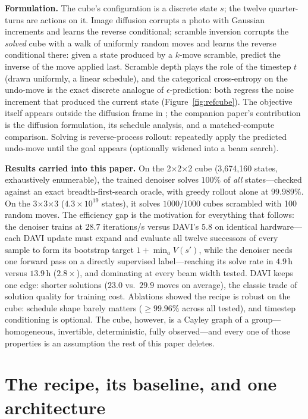 \documentclass[11pt]{article}
\begin{document}
\textbf{Formulation.} The cube's configuration is a discrete state $s$; the
twelve quarter-turns are actions on it. Image diffusion corrupts a photo
with Gaussian increments and learns the reverse conditional; scramble
inversion corrupts the \emph{solved} cube with a walk of uniformly random
moves and learns the reverse conditional there: given a state produced by a
$k$-move scramble, predict the inverse of the move applied last. Scramble
depth plays the role of the timestep $t$ (drawn uniformly, a linear
schedule), and the categorical cross-entropy on the undo-move is the exact
discrete analogue of $\epsilon$-prediction: both regress the noise increment
that produced the current state (Figure~\ref{fig:refcube}). The objective
itself appears outside the diffusion frame in \citet{takano2023}; the
companion paper's contribution is the diffusion formulation, its schedule
analysis, and a matched-compute comparison. Solving is reverse-process
rollout: repeatedly apply the predicted undo-move until the goal appears
(optionally widened into a beam search).

\textbf{Results carried into this paper.} On the 2$\times$2$\times$2 cube
(3{,}674{,}160 states, exhaustively enumerable), the trained denoiser solves
$100\%$ of \emph{all} states---checked against an exact breadth-first-search
oracle, with greedy rollout alone at $99.989\%$. On the 3$\times$3$\times$3
($4.3\times10^{19}$ states), it solves $1000/1000$ cubes scrambled with 100
random moves. The efficiency gap is the motivation for everything that
follows: the denoiser trains at $28.7$ iterations/s versus DAVI's $5.8$ on
identical hardware---each DAVI update must expand and evaluate all twelve
successors of every sample to form its bootstrap target
$1+\min_a V(s')$, while the denoiser needs one forward pass on a directly
supervised label---reaching its solve rate in $4.9$\,h versus $13.9$\,h
($2.8\times$), and dominating at every beam width tested. DAVI keeps one
edge: shorter solutions ($23.0$ vs.\ $29.9$ moves on average), the classic
trade of solution quality for training cost. Ablations showed the recipe is
robust on the cube: schedule shape barely matters ($\geq 99.96\%$ across all
tested), and timestep conditioning is optional. The cube, however, is a
Cayley graph of a group---homogeneous, invertible, deterministic, fully
observed---and every one of those properties is an assumption the rest of
this paper deletes.

\section{The recipe, its baseline, and one architecture}
\label{sec:recipe}
\end{document}
